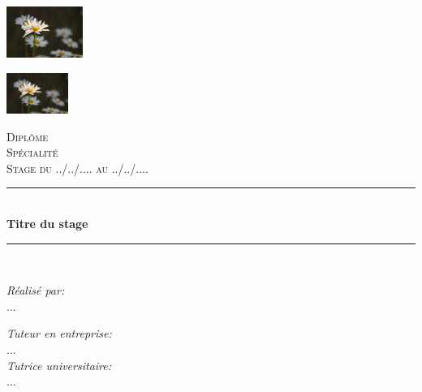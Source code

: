 \documentclass[french,pdf]{beamer}
\begin{document}
{
\begin{frame}
  \begin{minipage}{0.45\textwidth}
    \begin{flushleft}
      \includegraphics[width=2.5cm]{img.jpg}
    \end{flushleft}
  \end{minipage}
  \begin{minipage}{0.53\textwidth}
    \begin{flushright}
      \includegraphics[width=2cm]{img.jpg}
    \end{flushright}
  \end{minipage}

  \newcommand{\HRule}{\rule{\linewidth}{0.1mm}}
  \center

  \textsc{\Large Diplôme}\\
  \textsc{\Large Spécialité}\\
  \textsc{\large Stage du ../../.... au  ../../....}\\

  \HRule \\[0.1cm]
  { \Large \bfseries Titre du stage}\\[0.1cm]
  \HRule \\[0.3cm]

  \begin{minipage}{0.4\textwidth}
    \begin{flushleft} \large
      \emph{Réalisé par:}\\
      \textsc{...}
    \end{flushleft}
  \end{minipage}
  \begin{minipage}{0.4\textwidth}
    \begin{flushright} \large
      \emph{Tuteur en entreprise:} \\
      \textsc{...} \\ [0.1cm]
      \emph{Tutrice universitaire:} \\
      \textsc{...} \\
    \end{flushright}
  \end{minipage}
  \vfill
\end{frame}
}
\end{document}
